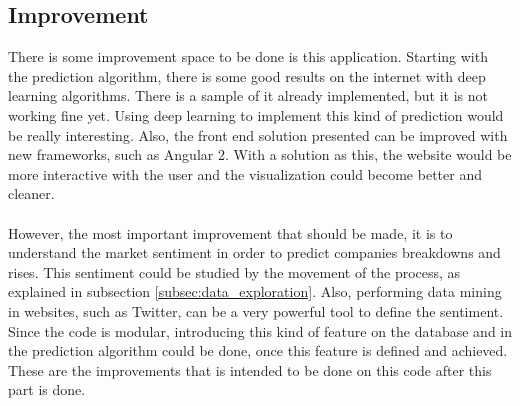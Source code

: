 \subsection{Improvement}
There is some improvement space to be done is this application. Starting with the prediction algorithm, there is some good results on the internet with deep learning algorithms. There is a sample
of it already implemented, but it is not working fine yet. Using deep learning to implement this kind of prediction would be really interesting. Also, the front end solution presented can be
improved with new frameworks, such as Angular 2. With a solution as this, the website would be more interactive with the user and the visualization could become better and cleaner.\\
\\
However, the most important improvement that should be made, it is to understand the market sentiment in order to predict companies breakdowns and rises. This sentiment could be studied by the movement
of the process, as explained in subsection \ref{subsec:data_exploration}. Also, performing data mining in websites, such as Twitter, can be a very powerful tool to define the sentiment. Since the 
code is modular, introducing this kind of feature on the database and in the prediction algorithm could be done, once this feature is defined and achieved. These are the improvements that is intended
to be done on this code after this part is done.